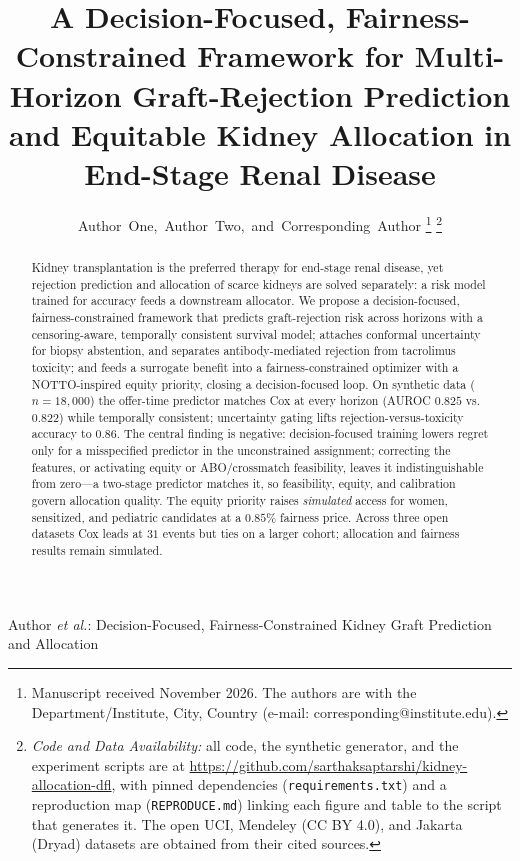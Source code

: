 \documentclass[journal]{IEEEtran}
\begin{document}
\title{A Decision-Focused, Fairness-Constrained Framework for Multi-Horizon Graft-Rejection Prediction and Equitable Kidney Allocation in End-Stage Renal Disease}

\author{Author~One,~Author~Two,~and~Corresponding~Author%
\thanks{Manuscript received November 2026. The authors are with the Department/Institute, City, Country (e-mail: corresponding@institute.edu).}%
\thanks{\emph{Code and Data Availability:} all code, the synthetic generator, and the experiment scripts are at \url{https://github.com/sarthaksaptarshi/kidney-allocation-dfl}, with pinned dependencies (\texttt{requirements.txt}) and a reproduction map (\texttt{REPRODUCE.md}) linking each figure and table to the script that generates it. The open UCI, Mendeley (CC BY 4.0), and Jakarta (Dryad) datasets are obtained from their cited sources.}}

%
{Author \MakeLowercase{\textit{et al.}}: Decision-Focused, Fairness-Constrained Kidney Graft Prediction and Allocation}

\maketitle

\begin{abstract}
Kidney transplantation is the preferred therapy for end-stage renal disease, yet rejection prediction and allocation of scarce kidneys are solved separately: a risk model trained for accuracy feeds a downstream allocator. We propose a decision-focused, fairness-constrained framework that predicts graft-rejection risk across horizons with a censoring-aware, temporally consistent survival model; attaches conformal uncertainty for biopsy abstention, and separates antibody-mediated rejection from tacrolimus toxicity; and feeds a surrogate benefit into a fairness-constrained optimizer with a NOTTO-inspired equity priority, closing a decision-focused loop. On synthetic data ($n=18{,}000$) the offer-time predictor matches Cox at every horizon (AUROC $0.825$ vs.\ $0.822$) while temporally consistent; uncertainty gating lifts rejection-versus-toxicity accuracy to $0.86$. The central finding is negative: decision-focused training lowers regret only for a misspecified predictor in the unconstrained assignment; correcting the features, or activating equity or ABO/crossmatch feasibility, leaves it indistinguishable from zero---a two-stage predictor matches it, so feasibility, equity, and calibration govern allocation quality. The equity priority raises \emph{simulated} access for women, sensitized, and pediatric candidates at a $0.85\%$ fairness price. Across three open datasets Cox leads at $31$ events but ties on a larger cohort; allocation and fairness results remain simulated.
\end{abstract}
\end{document}
